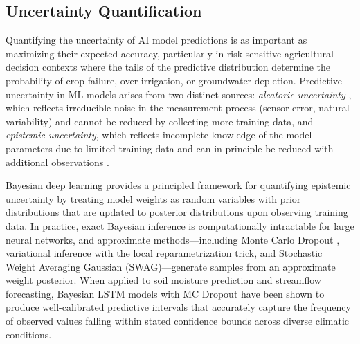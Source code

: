 \documentclass[land,review,accept,pdftex,oneauthor]{Definitions/mdpi}
\begin{document}
\subsection{Uncertainty Quantification}

Quantifying the uncertainty of AI model predictions is as important as maximizing their expected accuracy, particularly in risk-sensitive agricultural decision contexts where the tails of the predictive distribution determine the probability of crop failure, over-irrigation, or groundwater depletion. Predictive uncertainty in ML models arises from two distinct sources: \emph{aleatoric uncertainty %
}, which reflects irreducible noise in the measurement process (sensor error, natural variability) and cannot be reduced by collecting more training data, and \emph{epistemic uncertainty}, which reflects incomplete knowledge of the model parameters due to limited training data and can in principle be reduced with additional observations \citep{hullermeier2021aleatoric}.

Bayesian deep learning provides a principled framework for quantifying epistemic uncertainty by treating model weights as random variables with prior distributions that are updated to posterior distributions upon observing training data. In practice, exact Bayesian inference is computationally intractable for large neural networks, and approximate methods---including Monte Carlo Dropout \citep{gal2016dropout}, variational inference with the local reparametrization trick, and Stochastic Weight Averaging Gaussian (SWAG)---{generate} samples from an approximate weight posterior. When applied to soil moisture prediction and streamflow forecasting, Bayesian LSTM models with MC Dropout have been shown to produce well-calibrated predictive intervals that accurately capture the frequency of observed values falling within stated confidence bounds across diverse climatic conditions.
\end{document}
